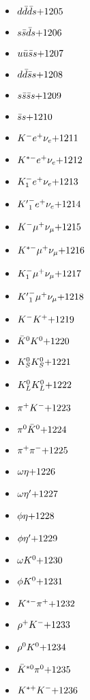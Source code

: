 \begin{multicols}{3}
\begin{itemize}
 \item $ d \bar{d} \bar{d} s \hfill{+1205}$
 \item $ s \bar{s} \bar{d} s \hfill{+1206}$
 \item $ u \bar{u} \bar{s} s \hfill{+1207}$
 \item $ d \bar{d} \bar{s} s \hfill{+1208}$
 \item $ s \bar{s} \bar{s} s \hfill{+1209}$
 \item $ \bar{s} s \hfill{+1210}$
 \item $ K^{-} e^{+} \nu_{e} \hfill{+1211}$
 \item $ K^{*-} e^{+} \nu_{e} \hfill{+1212}$
 \item $ K_{1}^{-} e^{+} \nu_{e} \hfill{+1213}$
 \item $ {K^{\prime}}_{1}^{-} e^{+} \nu_{e} \hfill{+1214}$
 \item $ K^{-} \mu^{+} \nu_{\mu} \hfill{+1215}$
 \item $ K^{*-} \mu^{+} \nu_{\mu} \hfill{+1216}$
 \item $ K_{1}^{-} \mu^{+} \nu_{\mu} \hfill{+1217}$
 \item $ {K^{\prime}}_{1}^{-} \mu^{+} \nu_{\mu} \hfill{+1218}$
 \item $ K^{-} K^{+} \hfill{+1219}$
 \item $ \bar{K}^{0} K^{0} \hfill{+1220}$
 \item $ K_{S}^{0} K_{S}^{0} \hfill{+1221}$
 \item $ K_{L}^{0} K_{L}^{0} \hfill{+1222}$
 \item $ \pi^{+} K^{-} \hfill{+1223}$
 \item $ \pi^{0} \bar{K}^{0} \hfill{+1224}$
 \item $ \pi^{+} \pi^{-} \hfill{+1225}$
 \item $ \omega \eta \hfill{+1226}$
 \item $ \omega {\eta^{\prime}} \hfill{+1227}$
 \item $ \phi \eta \hfill{+1228}$
 \item $ \phi {\eta^{\prime}} \hfill{+1229}$
 \item $ \omega K^{0} \hfill{+1230}$
 \item $ \phi K^{0} \hfill{+1231}$
 \item $ K^{*-} \pi^{+} \hfill{+1232}$
 \item $ \rho^{+} K^{-} \hfill{+1233}$
 \item $ \rho^{0} K^{0} \hfill{+1234}$
 \item $ \bar{K}^{*0} \pi^{0} \hfill{+1235}$
 \item $ K^{*+} K^{-} \hfill{+1236}$

\end{itemize}
\end{multicols}
